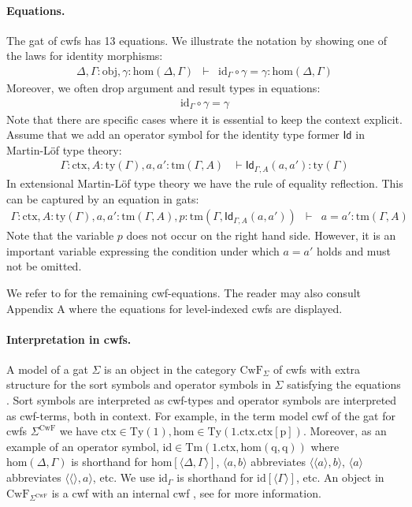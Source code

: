 \documentclass[submission,copyright,creativecommons]{eptcs}
\newcommand{\Id}{\mathsf{Id}}
\newcommand{\id}{\mathsf{id}}
\newcommand{\Ty}{\mathrm{Ty}}
\newcommand{\Tm}{\mathrm{Tm}}
\def\Obj{\mathrm{obj}}
\def\sub{\mathrm{hom}}
\def\id{\mathrm{id}}
\newcommand{\ctx}{\mathrm{ctx}}
\newcommand{\ty}{\mathrm{ty}}
\newcommand{\tm}{\mathrm{tm}}
\newcommand{\tuple}[1]{\langle #1 \rangle}
\def\p{\mathrm{p}}
\def\q{\mathrm{q}}
\def\CwF{\mathrm{CwF}}
\begin{document}
\paragraph{Equations.}
The gat of cwfs has 13 equations. We illustrate the notation by showing one of the laws for identity morphisms:
\begin{eqnarray*}
\Delta, \Gamma : \Obj, \gamma : \sub(\Delta,\Gamma) &\vdash& \id_\Gamma \circ \gamma = \gamma : \sub(\Delta,\Gamma)
\end{eqnarray*}
Moreover, we often drop argument and result types in equations:
\begin{eqnarray*}
\id_\Gamma \circ \gamma = \gamma
\end{eqnarray*}
Note that there are specific cases where it is essential to keep the context explicit. Assume that we add an operator symbol for the identity type former $\Id$ in Martin-Löf type theory:
\begin{eqnarray*}
\Gamma : \ctx, A : \ty(\Gamma), a, a' : \tm(\Gamma, A) &\vdash \Id_{\Gamma,A}(a,a'): \ty(\Gamma)
\end{eqnarray*}
In extensional Martin-Löf type theory \cite{martinlof:hannover} we have the rule of equality reflection. This can be captured by an equation in gats:
\begin{eqnarray*}
\Gamma : \ctx, A : \ty(\Gamma), a, a' : \tm(\Gamma, A),p :  \tm(\Gamma,\Id_{\Gamma,A}(a,a'))&\vdash& a = a' : \tm(\Gamma,A)
\end{eqnarray*}
Note that the variable $p$ does not occur on the right hand side.
However, it is an important variable expressing
the condition under which $a=a'$ holds and must not be omitted.

We refer to \cite{bezem:hofmann} for the remaining cwf-equations. The reader may also consult Appendix A where the equations for level-indexed cwfs are displayed.

\paragraph{Interpretation in cwfs.}
A model of a gat $\Sigma$ is an object in the category $\CwF_\Sigma$ of cwfs with extra structure for the sort symbols and operator symbols in $\Sigma$ satisfying the equations \cite{bezem:hofmann}. Sort symbols are interpreted as cwf-types and operator symbols are interpreted as cwf-terms, both in context. For example, in the term model cwf of the gat for cwfs $\Sigma^\CwF$ we have $\ctx \in \Ty(1), \sub \in \Ty(1.\ctx.\ctx[\p])$. Moreover, as an example of an operator symbol, $\id \in \Tm(1.\ctx,\sub(\q,\q))$ where $\sub(\Delta,\Gamma)$ is shorthand for
$\sub[\tuple{\Delta,\Gamma}]$, $\tuple{a,b}$ abbreviates $\tuple{\tuple{a}, b}$, $\tuple{a}$ abbreviates $\tuple{\tuple{}, a}$, etc. We use $\id_\Gamma$ is shorthand for $\id[\tuple{\Gamma}]$, etc. An object in $\CwF_{\Sigma^\CwF}$ is a cwf with an internal cwf , see \cite{bezem:hofmann} for more information.
\end{document}
